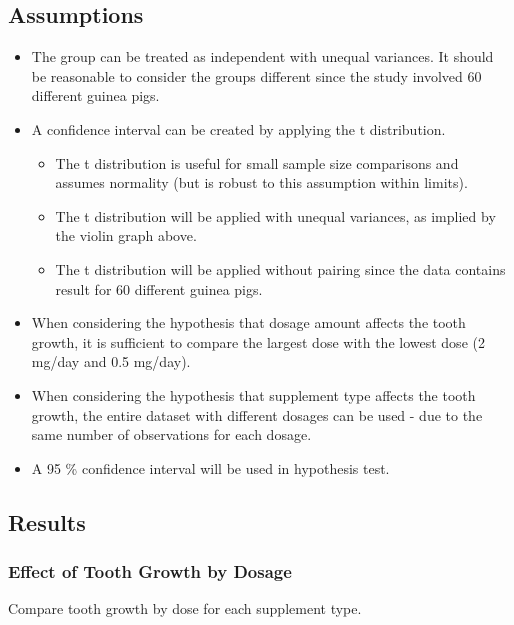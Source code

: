 \documentclass[]{article}
\providecommand{\tightlist}{%
  \setlength{\itemsep}{0pt}\setlength{\parskip}{0pt}}
\begin{document}
\subsection{Assumptions}\label{assumptions}

\begin{itemize}
\tightlist
\item
  The group can be treated as independent with unequal variances. It
  should be reasonable to consider the groups different since the study
  involved 60 different guinea pigs.
\item
  A confidence interval can be created by applying the t distribution.

  \begin{itemize}
  \tightlist
  \item
    The t distribution is useful for small sample size comparisons and
    assumes normality (but is robust to this assumption within limits).
  \item
    The t distribution will be applied with unequal variances, as
    implied by the violin graph above.
  \item
    The t distribution will be applied without pairing since the data
    contains result for 60 different guinea pigs.
  \end{itemize}
\item
  When considering the hypothesis that dosage amount affects the tooth
  growth, it is sufficient to compare the largest dose with the lowest
  dose (2 mg/day and 0.5 mg/day).
\item
  When considering the hypothesis that supplement type affects the tooth
  growth, the entire dataset with different dosages can be used - due to
  the same number of observations for each dosage.
\item
  A 95 \% confidence interval will be used in hypothesis test.
\end{itemize}

\subsection{Results}\label{results}

\subsubsection{Effect of Tooth Growth by
Dosage}\label{effect-of-tooth-growth-by-dosage}

Compare tooth growth by dose for each supplement type.
\end{document}
